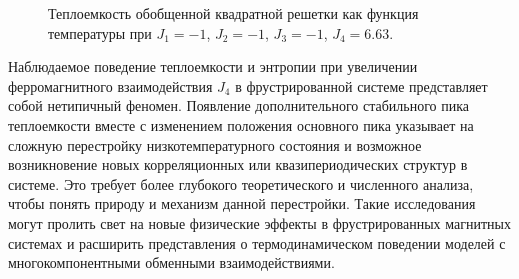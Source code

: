 \documentclass[utf8,12pt]{jetp}
\begin{document}
\begin{figure}[h]
	\begin{minipage}[h]{0.5\linewidth}
	\end{minipage}
	\hfill
	\begin{minipage}[h]{0.5\linewidth}
	\end{minipage}
	\caption{Теплоемкость обобщенной квадратной решетки как функция температуры при $J_1 = -1$, $J_2 = -1$, $J_3 = -1$, $J_4 = 6.63$.}
	\label{PlatoC}
\end{figure}

Наблюдаемое поведение теплоемкости и энтропии при увеличении ферромагнитного взаимодействия $J_4$ в фрустрированной системе представляет собой нетипичный феномен. Появление дополнительного стабильного пика теплоемкости вместе с изменением положения основного пика указывает на сложную перестройку низкотемпературного состояния и возможное возникновение новых корреляционных или квазипериодических структур в системе. Это требует более глубокого теоретического и численного анализа, чтобы понять природу и механизм данной перестройки. Такие исследования могут пролить свет на новые физические эффекты в фрустрированных магнитных системах и расширить представления о термодинамическом поведении моделей с многокомпонентными обменными взаимодействиями.
\end{document}
